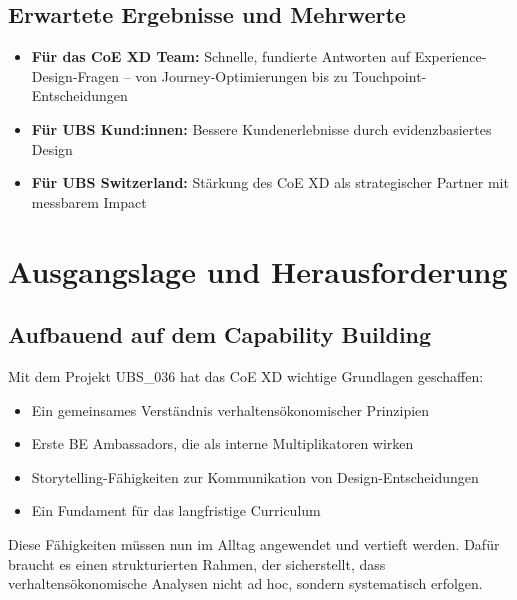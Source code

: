 \documentclass{fehradvice-report}
\begin{document}
\subsection{Erwartete Ergebnisse und Mehrwerte}

\begin{itemize}
    \item \textbf{Für das CoE XD Team:} Schnelle, fundierte Antworten auf Experience-Design-Fragen -- von Journey-Optimierungen bis zu Touchpoint-Entscheidungen
    \item \textbf{Für UBS Kund:innen:} Bessere Kundenerlebnisse durch evidenzbasiertes Design
    \item \textbf{Für UBS Switzerland:} Stärkung des CoE XD als strategischer Partner mit messbarem Impact
\end{itemize}

\newpage
\section{Ausgangslage und Herausforderung}

\subsection{Aufbauend auf dem Capability Building}

Mit dem Projekt UBS\_036 hat das CoE XD wichtige Grundlagen geschaffen:

\begin{itemize}
    \item Ein gemeinsames Verständnis verhaltensökonomischer Prinzipien
    \item Erste BE Ambassadors, die als interne Multiplikatoren wirken
    \item Storytelling-Fähigkeiten zur Kommunikation von Design-Entscheidungen
    \item Ein Fundament für das langfristige Curriculum
\end{itemize}

\begin{fainfobox}
Diese Fähigkeiten müssen nun im Alltag angewendet und vertieft werden. Dafür braucht es einen strukturierten Rahmen, der sicherstellt, dass verhaltensökonomische Analysen nicht ad hoc, sondern systematisch erfolgen.
\end{fainfobox}
\end{document}
